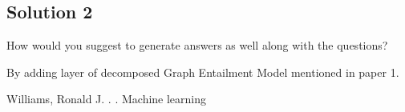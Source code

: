 \documentclass[12pt,leqno,a4paper]{article}
\begin{document}
\subsection{Solution 2}
How would you suggest to generate answers as well along with the questions?
\newline

By adding layer of decomposed Graph Entailment Model mentioned in paper 1. 

\begin{thebibliography}{}
Williams, Ronald J.
.
.
\newblock Machine learning

\end{thebibliography}
\end{document}
